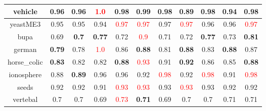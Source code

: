 \documentclass{article}%
\begin{document}
\begin{tabular}{c|cccccccccc}
\hline%
vehicle&0.96&0.96&\textcolor{red}{ 
1.0
}&0.98&\textbf{0.99}&0.98&0.89&\textbf{0.98}&0.94&\textbf{0.98}\\%
\hline%
yeastME3&0.95&0.95&0.94&\textcolor{red}{ 
0.97
}&\textcolor{red}{ 
0.97
}&0.97&\textcolor{red}{ 
0.97
}&0.96&0.96&\textcolor{red}{ 
0.97
}\\%
\hline%
bupa&0.69&\textbf{0.7}&\textbf{0.77}&0.72&\textcolor{red}{ 
0.9
}&0.71&0.72&\textbf{0.77}&0.73&\textbf{0.81}\\%
\hline%
german&\textbf{0.79}&0.78&\textcolor{red}{ 
1.0
}&0.86&\textbf{0.88}&0.81&\textbf{0.88}&0.83&\textbf{0.88}&0.87\\%
\hline%
horse\_colic&\textbf{0.83}&0.82&0.82&\textbf{0.88}&\textcolor{red}{ 
0.93
}&0.91&\textbf{0.92}&0.86&0.85&\textbf{0.88}\\%
\hline%
ionosphere&0.88&\textbf{0.89}&0.96&0.96&0.92&\textcolor{red}{ 
0.98
}&0.92&\textcolor{red}{ 
0.98
}&0.91&\textcolor{red}{ 
0.98
}\\%
\hline%
seeds&0.92&0.92&0.91&\textcolor{red}{ 
0.93
}&\textcolor{red}{ 
0.93
}&0.93&\textcolor{red}{ 
0.93
}&0.93&0.92&0.92\\%
\hline%
vertebal&0.7&0.7&0.69&\textcolor{red}{ 
0.73
}&\textbf{0.71}&0.69&0.7&0.7&0.71&0.71\\%
\hline%
\end{tabular}

%
\end{document}
